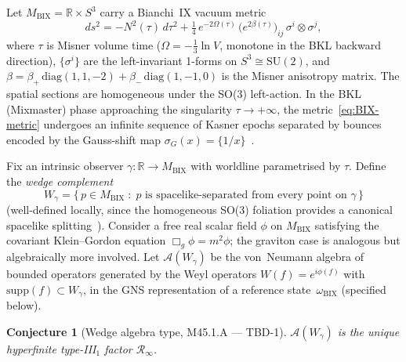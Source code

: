 \documentclass[12pt,a4paper]{article}
\newtheorem{conjecture}{Conjecture}
\begin{document}
Let $M_{\mathrm{BIX}} = \mathbb{R}\times S^3$ carry a Bianchi~IX vacuum metric
\begin{equation}
  ds^2 = -N^2(\tau)\,d\tau^2
         + \tfrac{1}{4}\,e^{-2\Omega(\tau)}\,
           \bigl(e^{2\beta(\tau)}\bigr)_{ij}\,\sigma^i\otimes\sigma^j,
  \label{eq:BIX-metric}
\end{equation}
where $\tau$ is Misner volume time ($\Omega = -\frac{1}{3}\ln V$,
monotone in the BKL backward direction),
$\{\sigma^i\}$ are the left-invariant 1-forms on $S^3\cong\mathrm{SU}(2)$,
and $\beta = \beta_+\,\mathrm{diag}(1,1,-2) + \beta_-\,\mathrm{diag}(1,-1,0)$
is the Misner anisotropy matrix.
The spatial sections are homogeneous under the SO(3) left-action.
In the BKL (Mixmaster) phase approaching the singularity
$\tau\to+\infty$, the metric~\eqref{eq:BIX-metric} undergoes an infinite
sequence of Kasner epochs separated by bounces encoded by the
Gauss-shift map $\sigma_G(x)=\{1/x\}$~\cite{ManinMarcolli2015}.

Fix an intrinsic observer $\gamma:\mathbb{R}\to M_{\mathrm{BIX}}$
with worldline parametrised by $\tau$.
Define the \emph{wedge complement}
\begin{equation}
  W_\gamma = \{\,p\in M_{\mathrm{BIX}}\;:\;
     p \text{ is spacelike-separated from every point on }\gamma\,\}
\end{equation}
(well-defined locally, since the homogeneous SO(3) foliation provides a
canonical spacelike splitting~\cite{HeinzleUggla2009}).
Consider a free real scalar field $\phi$ on $M_{\mathrm{BIX}}$
satisfying the covariant Klein--Gordon equation $\Box_g\phi = m^2\phi$;
the graviton case is analogous but algebraically more involved.
Let $\mathcal{A}(W_\gamma)$ be the von~Neumann algebra of bounded
operators generated by the Weyl operators $W(f) = e^{i\phi(f)}$
with $\mathrm{supp}(f)\subset W_\gamma$, in the GNS representation
of a reference state~$\omega_{\mathrm{BIX}}$ (specified below).

\begin{conjecture}[Wedge algebra type, M45.1.A --- TBD-1]
\label{conj:wedge}
$\mathcal{A}(W_\gamma)$ is the unique hyperfinite type-\textrm{III}$_1$ factor
$\mathcal{R}_\infty$.
\end{conjecture}
\end{document}
